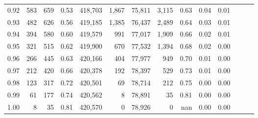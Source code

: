 \begin{tabular}{rrrrrrrrrrrrrr}
0.92 &    583 &    659 &  0.53 &  418,703 &    1,867 &  75,811 &   3,115 &  0.63 &  0.04 &      0.01 \\
0.93 &    482 &    626 &  0.56 &  419,185 &    1,385 &  76,437 &   2,489 &  0.64 &  0.03 &      0.01 \\
0.94 &    394 &    580 &  0.60 &  419,579 &      991 &  77,017 &   1,909 &  0.66 &  0.02 &      0.01 \\
0.95 &    321 &    515 &  0.62 &  419,900 &      670 &  77,532 &   1,394 &  0.68 &  0.02 &      0.00 \\
0.96 &    266 &    445 &  0.63 &  420,166 &      404 &  77,977 &     949 &  0.70 &  0.01 &      0.00 \\
0.97 &    212 &    420 &  0.66 &  420,378 &      192 &  78,397 &     529 &  0.73 &  0.01 &      0.00 \\
0.98 &    123 &    317 &  0.72 &  420,501 &       69 &  78,714 &     212 &  0.75 &  0.00 &      0.00 \\
0.99 &     61 &    177 &  0.74 &  420,562 &        8 &  78,891 &      35 &  0.81 &  0.00 &      0.00 \\
1.00 &      8 &     35 &  0.81 &  420,570 &        0 &  78,926 &       0 &   nan &  0.00 &      0.00 \\
\bottomrule
\end{tabular}

